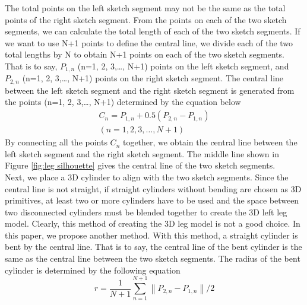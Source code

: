 \documentclass[runningheads]{llncs}
\begin{document}
The total points on the left sketch segment may not be the same as the total points of the right sketch segment. From the points on each of the two sketch segments, we can calculate the total length of each of the two sketch segments. If we want to use N+1 points to define the central line, we divide each of the two total lengths by N to obtain N+1 points on each of the two sketch segments. That is to say, $P_{1,n}$ (n=1, 2, 3,…, N+1) points on the left sketch segment, and $P_{2,n}$ (n=1, 2, 3,…, N+1) points on the right sketch segment. The central line between the left sketch segment and the right sketch segment is generated from the points (n=1, 2, 3,…, N+1) determined by the equation below
\begin{equation}
\begin{split}
    C_n=P_{1,n}+0.5(P_{2,n}-P_{1,n})\\
    (n=1, 2, 3,…, N+1)   
\end{split}
\end{equation}
By connecting all the points $C_n$ together, we obtain the central line between the left sketch segment and the right sketch segment. The middle line shown in Figure \ref{fig:leg silhouette} gives the central line of the two sketch segments.\\

Next, we place a 3D cylinder to align with the two sketch segments. Since the central line is not straight, if straight cylinders without bending are chosen as 3D primitives, at least two or more cylinders have to be used and the space between two disconnected cylinders must be blended together to create the 3D left leg model. Clearly, this method of creating the 3D leg model is not a good choice. In this paper, we propose another method. With this method, a straight cylinder is bent by the central line. That is to say, the central line of the bent cylinder is the same as the central line between the two sketch segments. The radius of the bent cylinder is determined by the following equation
\begin{equation}
    r=\frac{1}{N+1}\sum_{n=1}^{N+1}\left\|P_{2,n}-P_{1,n}\right\|/2
    \label{radius average}
\end{equation}
\end{document}
